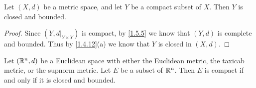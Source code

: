 \begin{cor}\label{1.5.6}
  Let \((X, d)\) be a metric space, and let \(Y\) be a compact subset of \(X\).
  Then \(Y\) is closed and bounded.
\end{cor}

\begin{proof}
  Since \((Y, d|_{Y \times Y})\) is compact, by \cref{1.5.5} we know that \((Y, d)\) is complete and bounded.
  Thus by \cref{1.4.12}(a) we know that \(Y\) is closed in \((X, d)\).
\end{proof}

\begin{thm}\label{1.5.7}
  Let \((\mathbb{R}^n, d)\) be a Euclidean space with either the Euclidean metric, the taxicab metric, or the supnorm metric.
  Let \(E\) be a subset of \(\mathbb{R}^n\).
  Then \(E\) is compact if and only if it is closed and bounded.
\end{thm}

